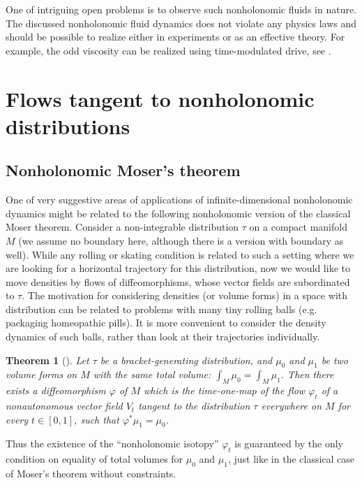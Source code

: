 \documentclass[11pt]{article}
\newtheorem{theorem}[lemma]{Theorem}
\theoremstyle{definition}
\newcounter{ai}
\begin{document}
One of intriguing open problems is to observe such  nonholonomic fluids in nature. The discussed nonholonomic fluid dynamics does not violate any physics laws and should be possible to realize either in experiments or as an effective theory. For example, the odd viscosity can be realized using time-modulated drive, see  \cite{PhysRevE.101.052606}.



\section{Flows tangent to nonholonomic distributions}

\subsection{Nonholonomic Moser's theorem}\label{sec:Moser}

One of  very suggestive areas of applications of infinite-dimensional nonholonomic dynamics might be 
related to the following nonholonomic version of the classical Moser theorem. Consider a non-integrable distribution $\tau$ on a compact manifold $M$ (we assume no boundary here, although there is a version with boundary as well). While any rolling or skating condition is related to such a setting where we are looking for a horizontal trajectory for this distribution, now we would like to move densities by flows of diffeomorphisms, whose vector fields are subordinated to  $\tau$. 
The motivation for considering densities (or volume forms) in a space with distribution can be related to problems with many tiny rolling balls (e.g. packaging homeopathic pills). It is more convenient to consider the density dynamics of such balls, rather than look at their trajectories individually.

\begin{theorem}[\cite{khesin2009nonholonomic}]\label{thm:nonhol} 
Let $\tau$ be a bracket-generating distribution, and $\mu_0$ and $\mu_1$ be two volume forms on $M$ 
with the same total volume: $\int_M \mu_0=\int_M\mu_1$. Then there exists a diffeomorphism $\varphi$ of $M$ 
which is the time-one-map of the flow $\varphi_t$ of a nonautonomous vector field $V_t$ tangent 
to the distribution $\tau$ everywhere on $M$ for every $t \in [0,1]$, such that $\varphi^*\mu_1 = \mu_0$. 
\end{theorem}

Thus the existence of the ``nonholonomic isotopy'' $\varphi_t$ is guaranteed by the only condition on equality of total volumes for $\mu_0$ and $\mu_1$, just like in the classical case of Moser's theorem without constraints.
\end{document}
